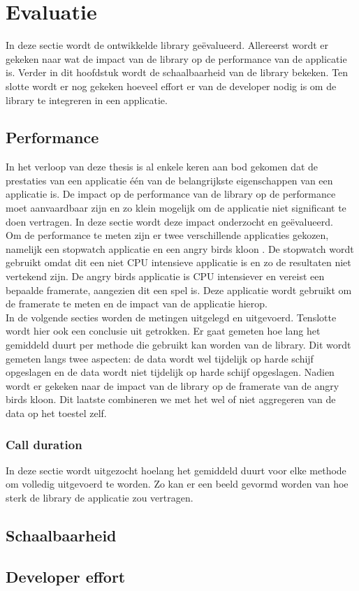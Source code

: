 \chapter{Evaluatie}
In deze sectie wordt de ontwikkelde library ge\"evalueerd. Allereerst wordt er gekeken naar wat de impact van de library op de performance van de applicatie is. Verder in dit hoofdstuk wordt de schaalbaarheid van de library bekeken. Ten slotte wordt er nog gekeken hoeveel effort er van de developer nodig is om de library te integreren in een applicatie.



\section{Performance}
In het verloop van deze thesis is al enkele keren aan bod gekomen dat de prestaties van een applicatie \'e\'en van de belangrijkste eigenschappen van een applicatie is. De impact op de performance van de library op de performance moet aanvaardbaar zijn en zo klein mogelijk om de applicatie niet significant te doen vertragen. In deze sectie wordt deze impact onderzocht en ge\"evalueerd. \\

Om de performance te meten zijn er twee verschillende applicaties gekozen, namelijk een stopwatch applicatie en een angry birds kloon \cite{AngryBirds}. De stopwatch wordt gebruikt omdat dit een niet CPU intensieve applicatie is en zo de resultaten niet vertekend zijn. De angry birds applicatie is CPU intensiever en vereist een bepaalde framerate, aangezien dit een spel is. Deze applicatie wordt gebruikt om de framerate te meten en de impact van de applicatie hierop. \\

In de volgende secties worden de metingen uitgelegd en uitgevoerd. Tenslotte wordt hier ook een conclusie uit getrokken. Er gaat gemeten hoe lang het gemiddeld duurt per methode die gebruikt kan worden van de library. Dit wordt gemeten langs twee aspecten: de data wordt wel tijdelijk op harde schijf opgeslagen en de data wordt niet tijdelijk op harde schijf opgeslagen. Nadien wordt er gekeken naar de impact van de library op de framerate van de angry birds kloon. Dit laatste combineren we met het wel of niet aggregeren van de data op het toestel zelf. \\

\subsection{Call duration}
In deze sectie wordt uitgezocht hoelang het gemiddeld duurt voor elke methode om volledig uitgevoerd te worden. Zo kan er een beeld gevormd worden van hoe sterk de library de applicatie zou vertragen.




\section{Schaalbaarheid}


\section{Developer effort}


